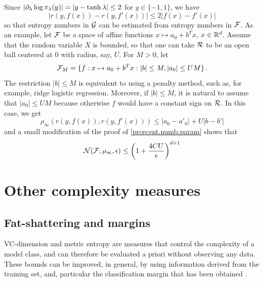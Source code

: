 Since $|\partial_\lambda \log \pi_\lambda(y)| = |y - \tanh \lambda| \leq 2$ for $y\in \{-1, 1\}$, we have
\[
|r(y, f(x)) - r(y, f'(x))| \leq 2 |f(x) - f'(x)|
\]
so that entropy numbers in ${\mathcal G}$ can be estimated from entropy numbers in ${\mathcal F}$. As an example, let ${\mathcal F}$ be a space of affine functions $x \mapsto a_0 + b^T x$, $x\in {\mathbb{R}}^d$. Assume that the random variable $X$ is bounded, so that one can take ${\mathcal R}$ to be an open ball centered at 0 with radius, say, $U$. For $M>0$, let
\[
{\mathcal F}_M = \{f:x \mapsto a_0 + b^T x: |b| \leq M, |a_0| \leq UM\}\,.
\]
The restriction $|b|\leq M$ is equivalent to using a penalty method, such as, for example, ridge logistic regression. Moreover, if $|b| \leq M$, it is natural to assume that $|a_0| \leq UM$ because otherwise $f$ would have  a constant sign on ${\mathcal R}$. In this case, we get
\[
\rho_\infty(r(y, f(x)), r(y, f'(x))) \leq |a_0 - a'_0| + U |b-b'|
\]
and a small modification of the proof of  \cref{prop:ent.numb.param} shows that 
\[
{\mathcal N}({\mathcal F}, \rho_\infty, \epsilon) \leq \left(1 + \frac{4CU}{\epsilon}\right)^{d+1}
\]






\section{Other complexity measures}
\subsection{Fat-shattering and margins}
VC-dimension and metric entropy are measures that control the complexity of a model class, and can therefore be evaluated a priori without observing any data. These bounds can be improved, in general, by using information derived from the training set, and, particular the classification margin that has been obtained \citep{bartlett1999generalization}. 
%

